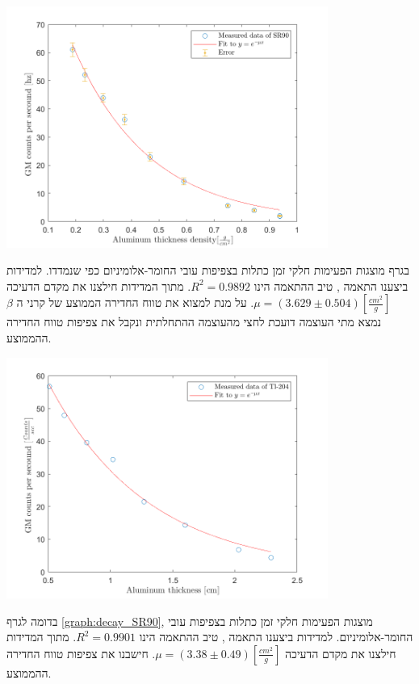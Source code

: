 \documentclass{article}
\begin{document}
\begin{graph}[ht!]
    \centering
    \includegraphics[width=0.79\textwidth]{SR90.png}
    \caption{
    }
    \label{graph:decay_SR90}
\end{graph}
 בגרף מוצגות הפעימות חלקי זמן כתלות בצפיפות עובי החומר-אלומיניום כפי שנמדדו.
 למדידות ביצענו התאמה ,
 טיב ההתאמה הינו 
 $R^2 = 0.9892$.
 מתוך המדידות חילצנו את מקדם הדעיכה
 $\mu = (3.629 \pm 0.504) [\frac{cm^2}{g}]$.
 על מנת למצוא את
טווח החדירה הממוצע של קרני ה
$\beta$
 נמצא מתי העוצמה דועכת לחצי מהעוצמה ההתחלתית ונקבל את צפיפות טווח החדירה ההממוצע.



\begin{graph}[ht!]
    \centering
    \includegraphics[width=0.79\textwidth]{Tl-204.png}
    \caption{
    }
    \label{graph:decay_Tl-204}
\end{graph}

 בדומה לגרף 
 \ref{graph:decay_SR90},
 מוצגות הפעימות חלקי זמן כתלות בצפיפות עובי החומר-אלומיניום.
 למדידות ביצענו התאמה ,
 טיב ההתאמה הינו 
 $R^2 = 0.9901$.
 מתוך המדידות חילצנו את מקדם הדעיכה
 $\mu = (3.38 \pm 0.49) [\frac{cm^2}{g}]$.
חישבנו את צפיפות טווח החדירה ההממוצע.
\end{document}
